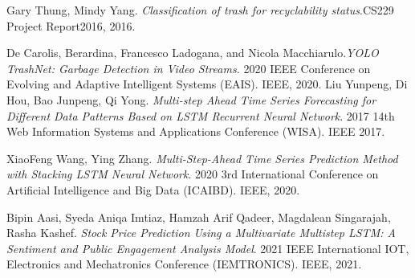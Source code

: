 \documentclass{Classes/UITBA}
\begin{document}
\begin{thebibliography}{SJL05}

 Gary Thung, Mindy Yang. \textit{Classification of trash for recyclability status}.CS229 Project Report2016, 2016.

 De Carolis, Berardina, Francesco Ladogana, and Nicola Macchiarulo.\textit{YOLO TrashNet: Garbage Detection in Video Streams.} 2020 IEEE Conference on Evolving and Adaptive Intelligent Systems (EAIS). IEEE, 2020.
 Liu Yunpeng, Di Hou, Bao Junpeng, Qi Yong. \textit{Multi-step Ahead Time Series Forecasting for Different Data Patterns Based on LSTM Recurrent Neural Network}. 2017 14th Web Information Systems and Applications Conference (WISA). IEEE 2017.

 XiaoFeng Wang, Ying Zhang. \textit{Multi-Step-Ahead Time Series Prediction Method with Stacking LSTM Neural Network}. 2020 3rd International Conference on Artificial Intelligence and Big Data (ICAIBD). IEEE, 2020.

 Bipin Aasi, Syeda Aniqa Imtiaz, Hamzah Arif Qadeer, Magdalean Singarajah, Rasha Kashef. \textit{Stock Price Prediction Using a Multivariate Multistep LSTM: A Sentiment and Public Engagement Analysis Model}. 2021 IEEE International IOT, Electronics and Mechatronics Conference (IEMTRONICS). IEEE, 2021.

\end{thebibliography}
\end{document}
